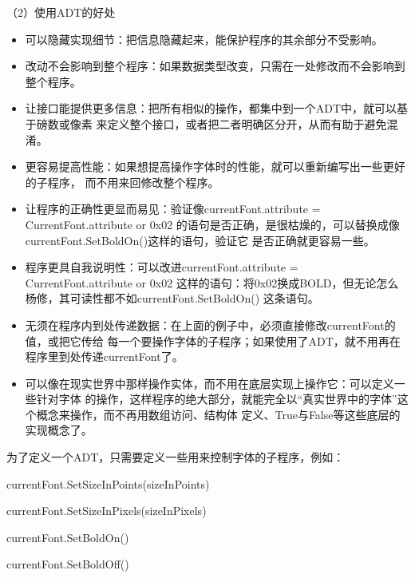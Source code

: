 \documentclass{article}
\begin{document}
\par
（2）使用ADT的好处
\par
\begin{itemize}
    \item 可以隐藏实现细节：把信息隐藏起来，能保护程序的其余部分不受影响。
    \item 改动不会影响到整个程序：如果数据类型改变，只需在一处修改而不会影响到整个程序。
    \item 让接口能提供更多信息：把所有相似的操作，都集中到一个ADT中，就可以基于磅数或像素
    来定义整个接口，或者把二者明确区分开，从而有助于避免混淆。
    \item 更容易提高性能：如果想提高操作字体时的性能，就可以重新编写出一些更好的子程序，
    而不用来回修改整个程序。
    \item 让程序的正确性更显而易见：验证像currentFont.attribute = CurrentFont.attribute or 0x02
    的语句是否正确，是很枯燥的，可以替换成像currentFont.SetBoldOn()这样的语句，验证它
    是否正确就更容易一些。
    \item 程序更具自我说明性：可以改进currentFont.attribute = CurrentFont.attribute or 0x02
    这样的语句：将0x02换成BOLD，但无论怎么杨修，其可读性都不如currentFont.SetBoldOn()
    这条语句。
    \item 无须在程序内到处传递数据：在上面的例子中，必须直接修改currentFont的值，或把它传给
    每一个要操作字体的子程序；如果使用了ADT，就不用再在程序里到处传递currentFont了。
    \item 可以像在现实世界中那样操作实体，而不用在底层实现上操作它：可以定义一些针对字体
    的操作，这样程序的绝大部分，就能完全以“真实世界中的字体”这个概念来操作，而不再用数组访问、结构体
    定义、True与False等这些底层的实现概念了。
\end{itemize}
为了定义一个ADT，只需要定义一些用来控制字体的子程序，例如：
\par
currentFont.SetSizeInPoints(sizeInPoints)
\par
currentFont.SetSizeInPixels(sizeInPixels)
\par
currentFont.SetBoldOn()
\par
currentFont.SetBoldOff()
\end{document}
